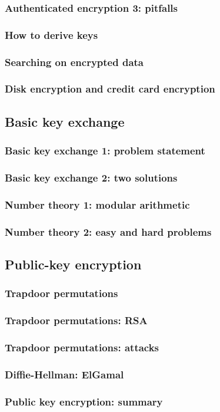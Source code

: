 \documentclass[10pt,a4paper]{report}
\begin{document}
\section{Authenticated encryption 3: pitfalls}
\section{How to derive keys}
\section{Searching on encrypted data}
\section{Disk encryption and credit card encryption}

\chapter{Basic key exchange}

\section{Basic key exchange 1: problem statement}
\section{Basic key exchange 2: two solutions}
\section{Number theory 1: modular arithmetic}
\section{Number theory 2: easy and hard problems}

\chapter{Public-key encryption}

\section{Trapdoor permutations}
\section{Trapdoor permutations: RSA}
\section{Trapdoor permutations: attacks}
\section{Diffie-Hellman: ElGamal}
\section{Public key encryption: summary}

\part{}
\end{document}
